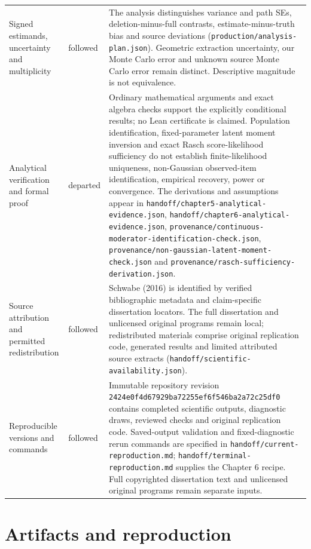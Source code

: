 \documentclass[11pt]{article}
\begin{document}
\begin{longtable}{p{95pt}p{49pt}p{293pt}}
Signed estimands, uncertainty and multiplicity & followed &  The analysis distinguishes variance and path SEs, deletion-minus-full contrasts, estimate-minus-truth bias and source deviations (\nolinkurl{production/analysis-plan.json}). Geometric extraction uncertainty, our Monte Carlo error and unknown source Monte Carlo error remain distinct. Descriptive magnitude is not equivalence.\\
Analytical verification and formal proof & departed & Ordinary mathematical arguments and exact algebra checks support the explicitly conditional results; no Lean certificate is claimed. Population identification, fixed-parameter latent moment inversion and exact Rasch score-likelihood sufficiency do not establish finite-likelihood uniqueness, non-Gaussian observed-item identification, empirical recovery, power or convergence. The derivations and assumptions appear in \nolinkurl{handoff/chapter5-analytical-evidence.json}, \nolinkurl{handoff/chapter6-analytical-evidence.json}, \nolinkurl{provenance/continuous-moderator-identification-check.json}, \nolinkurl{provenance/non-gaussian-latent-moment-check.json} and \nolinkurl{provenance/rasch-sufficiency-derivation.json}.\\
Source attribution and permitted redistribution & followed &  Schwabe (2016) is identified by verified bibliographic metadata and claim-specific dissertation locators. The full dissertation and unlicensed original programs remain local; redistributed materials comprise original replication code, generated results and limited attributed source extracts (\nolinkurl{handoff/scientific-availability.json}).\\
Reproducible versions and commands & followed &  Immutable repository revision \nolinkurl{2424e0f4d67929ba72255ef6f546ba2a72c25df0} contains completed scientific outputs, diagnostic draws, reviewed checks and original replication code. Saved-output validation and fixed-diagnostic rerun commands are specified in \nolinkurl{handoff/current-reproduction.md}; \nolinkurl{handoff/terminal-reproduction.md} supplies the Chapter 6 recipe. Full copyrighted dissertation text and unlicensed original programs remain separate inputs.\\
\bottomrule\end{longtable}\section{Artifacts and reproduction}
\end{document}
